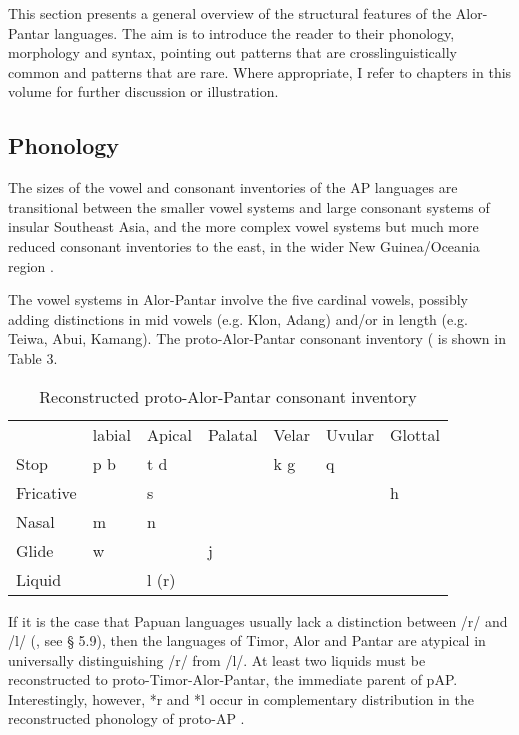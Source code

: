This section presents a general overview of the structural features of the Alor-Pantar languages. The aim is to introduce the reader to their phonology, morphology and syntax, pointing out patterns that are crosslinguistically common and patterns that are rare. Where appropriate, I refer to chapters in this volume for further discussion or illustration.

\subsection{Phonology}
The sizes of the vowel and consonant inventories of the AP languages are transitional between the smaller vowel systems and large consonant systems of insular Southeast Asia, and the more complex vowel systems but much more reduced consonant inventories to the east, in the wider New Guinea/Oceania region \citep[cf.][]{Hajek2010}.

The vowel systems in Alor-Pantar involve the five cardinal vowels, possibly adding distinctions in mid vowels (e.g. Klon, Adang) and/or in length (e.g. Teiwa, Abui, Kamang). The proto-Alor-Pantar consonant inventory (\citet{HoltonEtAl2012,HoltonEtAlthisvolumea} is shown in Table 3.



\begin{table}\centering
\begin{tabular}{lllllll} & {labial} & {Apical} & {Palatal} & {Velar} & {Uvular} & {Glottal}\\
{Stop} & {p  b} & {t  d} &  & {k  g} & {q} & \\
{Fricative} &  & {s} &  &  &  & {h}\\
{Nasal} & {m} & {n} &  &  &  & \\
{Glide} & {w} &  & {j} &  &  & \\
{Liquid} &  & {l (r)} &  &  &  & \\
\end{tabular}
\caption{Reconstructed proto-Alor-Pantar consonant inventory}
\end{table}

If it is the case that Papuan languages usually lack a distinction between /r/ and /l/ (\citet{Foley1986}, see {\S} 5.9), then the languages of Timor, Alor and Pantar are atypical in universally distinguishing /r/ from /l/. At least two liquids must be reconstructed to proto-Timor-Alor-Pantar, the immediate parent of pAP. Interestingly, however, *r and *l occur in complementary distribution in the reconstructed phonology of proto-AP \citep{HoltonEtAl2012}.

